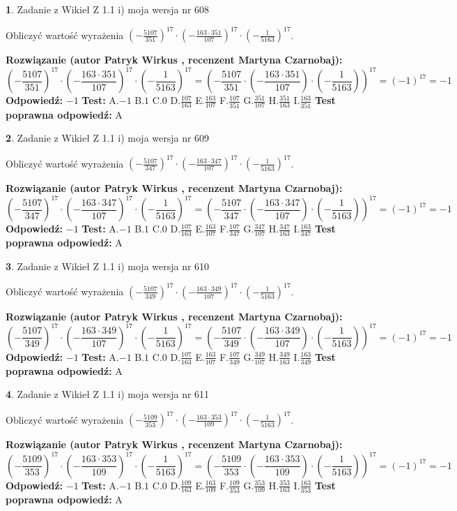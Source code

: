 \documentclass[12pt, a4paper]{article}
\theoremstyle{definition} %
\newtheorem{zad}{}
\newcommand{\zadStart}[1]{\begin{zad}#1\newline}
\newcommand{\zadStop}{\end{zad}}
\newcommand{\rozwStart}[2]{\noindent \textbf{Rozwiązanie (autor #1 , recenzent #2): }\newline}
\newcommand{\rozwStop}{\newline}
\newcommand{\odpStart}{\noindent \textbf{Odpowiedź:}\newline}
\newcommand{\odpStop}{\newline}
\newcommand{\testStart}{\noindent \textbf{Test:}\newline}
\newcommand{\testStop}{\newline}
\newcommand{\kluczStart}{\noindent \textbf{Test poprawna odpowiedź:}\newline}
\newcommand{\kluczStop}{\newline}
\begin{document}
\zadStart{Zadanie z Wikieł Z 1.1 i) moja wersja nr 608}

Obliczyć wartość wyrażenia $(-\frac{5107}{351})^{17} \cdot (-\frac{163 \cdot 351}{107})^{17} \cdot (-\frac{1}{5163})^{17}$.
\zadStop
\rozwStart{Patryk Wirkus}{Martyna Czarnobaj}
$$(-\frac{5107}{351})^{17} \cdot (-\frac{163 \cdot 351}{107})^{17} \cdot (-\frac{1}{5163})^{17} = (-\frac{5107}{351} \cdot (-\frac{163 \cdot 351}{107}) \cdot (-\frac{1}{5163}))^{17} = (-1)^{17} = -1$$
\rozwStop
\odpStart
$-1$
\odpStop
\testStart
A.$-1$ B.$1$ C.$0$ D.$\frac{107}{163}$ E.$\frac{163}{107}$
F.$\frac{107}{351}$ G.$\frac{351}{107}$
H.$\frac{351}{163}$
I.$\frac{163}{351}$
\testStop
\kluczStart
A
\kluczStop



\zadStart{Zadanie z Wikieł Z 1.1 i) moja wersja nr 609}

Obliczyć wartość wyrażenia $(-\frac{5107}{347})^{17} \cdot (-\frac{163 \cdot 347}{107})^{17} \cdot (-\frac{1}{5163})^{17}$.
\zadStop
\rozwStart{Patryk Wirkus}{Martyna Czarnobaj}
$$(-\frac{5107}{347})^{17} \cdot (-\frac{163 \cdot 347}{107})^{17} \cdot (-\frac{1}{5163})^{17} = (-\frac{5107}{347} \cdot (-\frac{163 \cdot 347}{107}) \cdot (-\frac{1}{5163}))^{17} = (-1)^{17} = -1$$
\rozwStop
\odpStart
$-1$
\odpStop
\testStart
A.$-1$ B.$1$ C.$0$ D.$\frac{107}{163}$ E.$\frac{163}{107}$
F.$\frac{107}{347}$ G.$\frac{347}{107}$
H.$\frac{347}{163}$
I.$\frac{163}{347}$
\testStop
\kluczStart
A
\kluczStop



\zadStart{Zadanie z Wikieł Z 1.1 i) moja wersja nr 610}

Obliczyć wartość wyrażenia $(-\frac{5107}{349})^{17} \cdot (-\frac{163 \cdot 349}{107})^{17} \cdot (-\frac{1}{5163})^{17}$.
\zadStop
\rozwStart{Patryk Wirkus}{Martyna Czarnobaj}
$$(-\frac{5107}{349})^{17} \cdot (-\frac{163 \cdot 349}{107})^{17} \cdot (-\frac{1}{5163})^{17} = (-\frac{5107}{349} \cdot (-\frac{163 \cdot 349}{107}) \cdot (-\frac{1}{5163}))^{17} = (-1)^{17} = -1$$
\rozwStop
\odpStart
$-1$
\odpStop
\testStart
A.$-1$ B.$1$ C.$0$ D.$\frac{107}{163}$ E.$\frac{163}{107}$
F.$\frac{107}{349}$ G.$\frac{349}{107}$
H.$\frac{349}{163}$
I.$\frac{163}{349}$
\testStop
\kluczStart
A
\kluczStop



\zadStart{Zadanie z Wikieł Z 1.1 i) moja wersja nr 611}

Obliczyć wartość wyrażenia $(-\frac{5109}{353})^{17} \cdot (-\frac{163 \cdot 353}{109})^{17} \cdot (-\frac{1}{5163})^{17}$.
\zadStop
\rozwStart{Patryk Wirkus}{Martyna Czarnobaj}
$$(-\frac{5109}{353})^{17} \cdot (-\frac{163 \cdot 353}{109})^{17} \cdot (-\frac{1}{5163})^{17} = (-\frac{5109}{353} \cdot (-\frac{163 \cdot 353}{109}) \cdot (-\frac{1}{5163}))^{17} = (-1)^{17} = -1$$
\rozwStop
\odpStart
$-1$
\odpStop
\testStart
A.$-1$ B.$1$ C.$0$ D.$\frac{109}{163}$ E.$\frac{163}{109}$
F.$\frac{109}{353}$ G.$\frac{353}{109}$
H.$\frac{353}{163}$
I.$\frac{163}{353}$
\testStop
\kluczStart
A
\kluczStop
\end{document}
